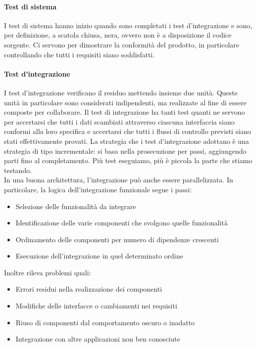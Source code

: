 			
			
			\paragraph{Test di sistema} \label{testsistema} 
			I test di sistema hanno inizio quando sono completati i test d'integrazione e sono, per definizione, a scatola chiusa, nera, ovvero non è a disposizione il codice sorgente.
			Ci servono per dimostrare la conformità del prodotto, in particolare controllando che tutti i requisiti siano soddisfatti.
			
			\paragraph{Test d'integrazione} \label{testintegrazione}
			I test d'integrazione verificano il residuo mettendo insieme due unità. Queste unità in particolare sono considerati indipendenti, ma realizzate al fine di essere composte per collaborare.
			Il test di integrazione ha tanti test quanti ne servono per accertarsi che tutti i dati scambiati attraverso ciascuna interfaccia siano conformi alla loro specifica e accertarsi che tutti i flussi di controllo previsti siano stati effettivamente provati.
			La strategia che i test d'integrazione adottano è una strategia di tipo incrementale: si basa nella prosecuzione per passi, aggiungendo parti fino al completamento. 
			Più test eseguiamo, più è piccola la parte che stiamo testando. \\
			In una buona architettura, l'integrazione può anche essere parallelizzata.
			In particolare, la logica dell'integrazione funzionale segue i passi:
			\begin{itemize}
				\item Selezione delle funzionalità da integrare
				\item Identificazione delle varie componenti che svolgono quelle funzionalità
				\item Ordinamento delle componenti per numero di dipendenze crescenti
				\item Esecuzione dell'integrazione in quel determinato ordine
			\end{itemize}
			Inoltre rileva problemi quali:
			\begin{itemize}
				\item Errori residui nella realizzazione dei componenti
				\item Modifiche delle interfacce o cambiamenti nei requisiti
				\item Riuso di componenti dal comportamento oscuro o inadatto
				\item Integrazione con altre applicazioni non ben conosciute
			\end{itemize}
			
